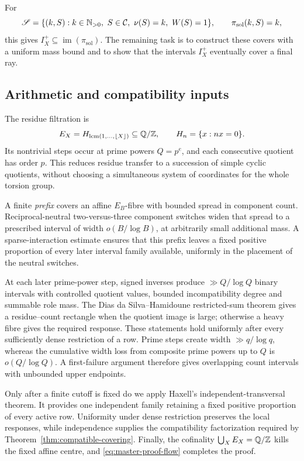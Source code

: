 For
\begin{equation}\label{eq:solution-object}
\mathscr S=\{(k,S):k\in\N_{>0},\ S\in\mathcal C,\ \nu(S)=k,\ W(S)=1\},
\qquad \pi_{\mathrm{sol}}(k,S)=k,
\end{equation}
this gives $I_X^+\subseteq\operatorname{im}(\pi_{\mathrm{sol}})$.  The remaining task is to construct these covers with a uniform mass bound and to show that the intervals $I_X^+$ eventually cover a final ray.

\subsection*{Arithmetic and compatibility inputs}

The residue filtration is
\[
E_X=H_{\operatorname{lcm}(1,\ldots,\lfloor X\rfloor)}
\subseteq\mathbb Q/\mathbb Z,
\qquad H_n=\{x:nx=0\}.
\]
Its nontrivial steps occur at prime powers $Q=p^e$, and each consecutive quotient has order $p$.  This reduces residue transfer to a succession of simple cyclic quotients, without choosing a simultaneous system of coordinates for the whole torsion group.

A finite \emph{prefix} covers an affine $E_B$-fibre with bounded spread in component count.  Reciprocal-neutral two-versus-three component switches widen that spread to a prescribed interval of width $o(B/\log B)$, at arbitrarily small additional mass.  A sparse-interaction estimate ensures that this prefix leaves a fixed positive proportion of every later interval family available, uniformly in the placement of the neutral switches.

At each later prime-power step, signed inverses produce $\gg Q/\log Q$ binary intervals with controlled quotient values, bounded incompatibility degree and summable role mass.  The Dias da Silva--Hamidoune restricted-sum theorem gives a residue--count rectangle when the quotient image is large; otherwise a heavy fibre gives the required response.  These statements hold uniformly after every sufficiently dense restriction of a row.  Prime steps create width $\gg q/\log q$, whereas the cumulative width loss from composite prime powers up to $Q$ is $o(Q/\log Q)$.  A first-failure argument therefore gives overlapping count intervals with unbounded upper endpoints.

Only after a finite cutoff is fixed do we apply Haxell's independent-transversal theorem.  It provides one independent family retaining a fixed positive proportion of every active row.  Uniformity under dense restriction preserves the local responses, while independence supplies the compatibility factorization required by Theorem~\ref{thm:compatible-covering}.  Finally, the cofinality $\bigcup_XE_X=\mathbb Q/\mathbb Z$ kills the fixed affine centre, and \eqref{eq:master-proof-flow} completes the proof.

